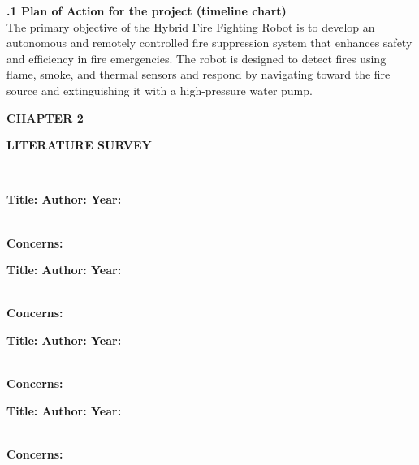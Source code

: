 \documentclass[12pt,a4paper]{article}
\begin{document}
\begin{flushleft}
{\fontsize{12}{20}\selectfont\textbf{.1 Plan of Action for the project \small{(timeline chart)}} }	\\[3mm]
\justifying \noindent The primary objective of the Hybrid Fire Fighting Robot is to develop an autonomous and remotely 
controlled fire suppression system that enhances safety and efficiency in fire emergencies. The 
robot is designed to detect fires using flame, smoke, and thermal sensors and respond by navigating 
toward the fire source and extinguishing it with a high-pressure water pump. 	

\end{flushleft}		
\newpage
\begin{flushleft}
{\fontsize{16pt}{18pt}\selectfont \textbf{CHAPTER 2}}
\end{flushleft}		
\begin{center}
{\fontsize{18pt}{22pt}\selectfont \textbf{LITERATURE SURVEY}}
\end{center}
\onehalfspacing
\blindtext\\
\begin{flushleft}
{\fontsize{12}{14}\selectfont\textbf{\cite{1} Title:
\newline Author:
\newline Year:}	}								
\end{flushleft}		
\blindtext\\
{\fontsize{12}{14}\selectfont\textbf{Concerns:
}}								
\begin{flushleft}
{\fontsize{12}{14}\selectfont\textbf{\cite{2}Title:
\newline Author:
\newline Year:}		}								
\end{flushleft}		
\blindtext\\
{\fontsize{12}{14}\selectfont\textbf{Concerns:
}}								

\begin{flushleft}
{\fontsize{12}{14}\selectfont\textbf{\cite{3}Title:
\newline Author:
\newline Year:}		}								
\end{flushleft}		
\blindtext\\
{\fontsize{12}{14}\selectfont\textbf{Concerns:
}}								
\begin{flushleft}
{\fontsize{12}{14}\selectfont\textbf{\cite{4}Title:
\newline Author:
\newline Year:}		}								
\end{flushleft}		
\blindtext\\
{\fontsize{12}{14}\selectfont\textbf{Concerns:
}}								
\end{document}
